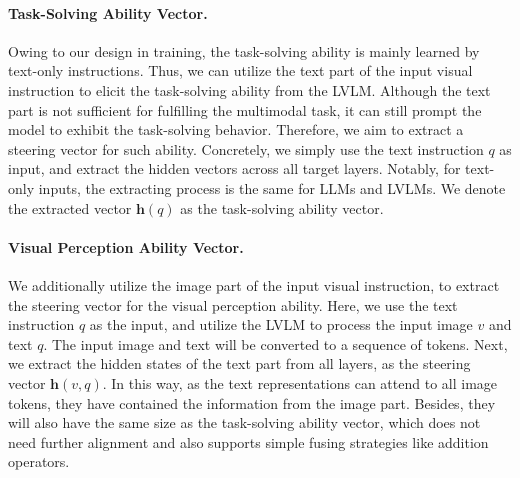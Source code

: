 \paragraph{Task-Solving Ability Vector.} 
Owing to our design in training, the task-solving ability is mainly learned by text-only instructions. 
Thus, we can utilize the text part of the input visual instruction to elicit the task-solving ability from the LVLM.
Although the text part is not sufficient for fulfilling the multimodal task, it can still prompt the model to exhibit the task-solving behavior. Therefore, we aim to extract a steering vector for such ability.
Concretely, we simply use the text instruction $q$ as input, and extract the hidden vectors across all target layers.
Notably, for text-only inputs, the extracting process is the same for LLMs and LVLMs. We denote the extracted vector $\bm{h}(q)$ as the task-solving ability vector.



\paragraph{Visual Perception Ability Vector.} 
We additionally utilize the image part of the input visual instruction, to extract the steering vector for the visual perception ability.
Here, we use the text instruction $q$ as the input, and utilize the LVLM to process the input image $v$ and text $q$. The input image and text will be converted to a sequence of tokens.
Next, we extract the hidden states of the text part from all layers, as the steering vector $\bm{h}(v, q)$.
In this way, as the text representations can attend to all image tokens, they have contained the information from the image part. Besides, they will also have the same size as the task-solving ability vector, which does not need further alignment and also supports simple fusing strategies like addition operators.

